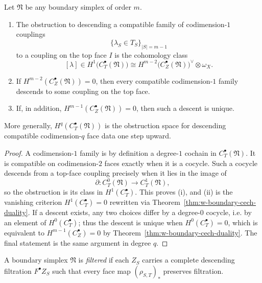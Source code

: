 \begin{theorem}
\label{thm:w-higher-mayer-vietoris-couplings}
Let $\mathfrak N$ be any boundary simplex of order $m$.
\begin{enumerate}[label=(\roman*)]
\item The obstruction to descending a compatible family of codimension-$1$ couplings
\[
\{\lambda_S\in T_S\}_{|S|=m-1}
\]
to a coupling on the top face $I$ is the cohomology class
\[
[\lambda]\in H^1\bigl(C_T^\bullet(\mathfrak N)\bigr)
\cong
H^{m-2}\bigl(C_Z^\bullet(\mathfrak N)\bigr)^\vee\otimes \omega_X.
\]
\item If $H^{m-2}(C_Z^\bullet(\mathfrak N))=0$, then every compatible codimension-$1$ family descends to
some coupling on the top face.
\item If, in addition, $H^{m-1}(C_Z^\bullet(\mathfrak N))=0$, then such a descent is unique.
\end{enumerate}
More generally, $H^q(C_T^\bullet(\mathfrak N))$ is the obstruction space for descending compatible
codimension-$q$ face data one step upward.
\end{theorem}

\begin{proof}
A codimension-$1$ family is by definition a degree-$1$ cochain in $C_T^\bullet(\mathfrak N)$.  It is
compatible on codimension-$2$ faces exactly when it is a cocycle.  Such a cocycle descends from a top-face
coupling precisely when it lies in the image of
\[
\partial\colon C_T^0(\mathfrak N)\to C_T^1(\mathfrak N),
\]
so the obstruction is its class in $H^1(C_T^\bullet)$.  This proves (i), and (ii) is the vanishing criterion
$H^1(C_T^\bullet)=0$ rewritten via Theorem~\ref{thm:w-boundary-cech-duality}.  If a descent exists, any two
choices differ by a degree-$0$ cocycle, i.e. by an element of $H^0(C_T^\bullet)$; thus the descent is unique
when $H^0(C_T^\bullet)=0$, which is equivalent to $H^{m-1}(C_Z^\bullet)=0$ by Theorem~\ref{thm:w-boundary-cech-duality}.
The final statement is the same argument in degree $q$.
\end{proof}

\begin{definition}
\label{def:w-filtered-boundary-simplex}
A boundary simplex $\mathfrak N$ is \emph{filtered} if each $Z_S$ carries a complete descending filtration
$F^\bullet Z_S$ such that every face map $(\rho_{S,T})_*$ preserves filtration.
\end{definition}

